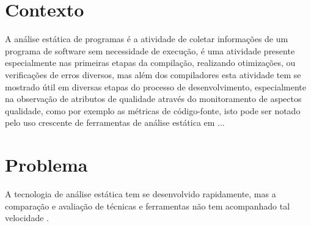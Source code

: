 
%

\section{Contexto}
A análise estática de programas é a atividade de coletar informações de um
programa de software sem necessidade de execução, é uma atividade presente
especialmente nas primeiras etapas da compilação, realizando otimizações, ou
verificações de erros diversos, mas além dos compiladores esta atividade tem
se mostrado útil em diversas etapas do processo de desenvolvimento,
especialmente na observação de atributos de qualidade através do monitoramento
de aspectos qualidade, como por exemplo as métricas de código-fonte, isto pode
ser notado pelo uso crescente de ferramentas de análise estática em ...



\section{Problema}

A tecnologia de análise estática tem se desenvolvido rapidamente, mas a
comparação e avaliação de técnicas e ferramentas não tem acompanhado tal
velocidade \cite{Li2010}.

